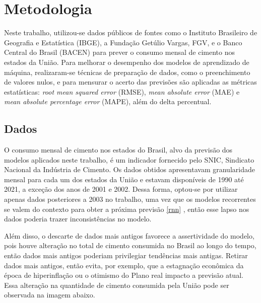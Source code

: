 
\chapter{Metodologia}

Neste trabalho, utilizou-se dados públicos de fontes como o Instituto Brasileiro 
de Geografia e Estatística (IBGE), a Fundação Getúlio Vargas, FGV, e o 
Banco Central do Brasil (BACEN) para prever o consumo mensal de 
cimento nos estados da União. Para melhorar o desempenho dos modelos de 
aprendizado de máquina, realizaram-se técnicas
de preparação de dados, como o preenchimento de valores nulos, e para mensurar 
o acerto das previsões são aplicadas as métricas estatísticas: \textit {root 
mean squared error} (RMSE),  \textit{mean absolute error} (MAE) e \textit{mean 
absolute percentage error} (MAPE), além do delta percentual.


\section{Dados}
\label{sec:dados}

O consumo mensal de cimento nos estados do Brasil, alvo da previsão 
dos modelos aplicados neste trabalho, é um indicador fornecido pelo SNIC, 
Sindicato Nacional da Indústria de Cimento. Os dados obtidos apresentavam granularidade
mensal para cada um dos estados da União e estavam disponíveis de 1990 até 2021,
a exceção dos anos de 2001 e 2002. Dessa forma, optou-se por utilizar apenas 
dados posteriores a 2003 no trabalho, uma vez que os modelos recorrentes se 
valem do contexto para obter a próxima previsão \ref{rnn} , então esse lapso nos dados
poderia trazer inconsistências no modelo.

Além disso, o descarte de dados mais antigos favorece a assertividade do 
modelo, pois houve alteração no total de cimento consumida no Brasil
ao longo do tempo, então dados mais antigos poderiam privilegiar tendências 
mais antigas. Retirar dados mais antigos, então evita, por exemplo, que a 
estagnação econômica da época de hiperinflação ou o otimismo do Plano real
impacto a previsão atual. Essa alteração na quantidade de cimento consumida pela União
pode ser observada na imagem abaixo. 

